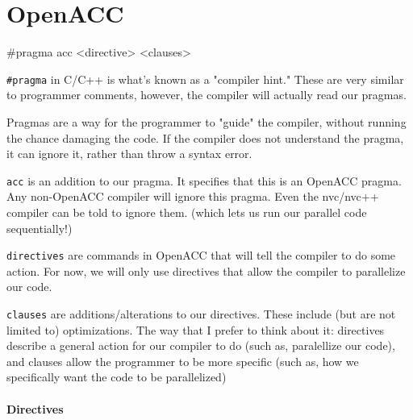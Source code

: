 \chapter{OpenACC}

\begin{codeblock}[language=C]
#pragma acc <directive> <clauses>
\end{codeblock}

\texttt{\#pragma} in C/C++ is what's known as a "compiler hint." These are very similar to programmer comments, however, the compiler will actually read our pragmas. 

Pragmas are a way for the programmer to "guide" the compiler, without running the chance damaging the code. If the compiler does not understand the pragma, it can ignore it, rather than throw a syntax error.

\texttt{acc} is an addition to our pragma. It speciﬁes that this is an OpenACC pragma. Any non-OpenACC compiler will ignore this pragma. Even the nvc/nvc++ compiler can be told to ignore them. (which lets us run our parallel code sequentially!)

\texttt{directives} are commands in OpenACC that will tell the compiler to do some action. For now, we will only use directives that allow the compiler to parallelize our code.


\texttt{clauses} are additions/alterations to our directives. These include (but are not limited to) optimizations. The way that I prefer to think about it: directives describe a general action for our compiler to do (such as, paralellize our code), and clauses allow the programmer to be more speciﬁc (such as, how we speciﬁcally want the code to be parallelized)

\subsubsection{Directives}

